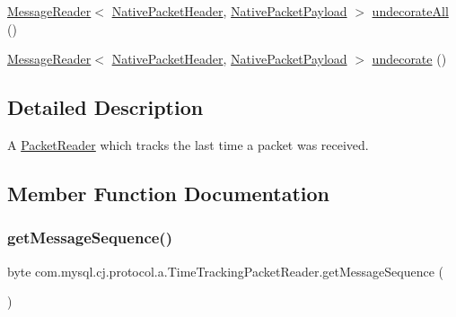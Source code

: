 \begin{DoxyCompactItemize}
\item 
\mbox{\hyperlink{interfacecom_1_1mysql_1_1cj_1_1protocol_1_1_message_reader}{Message\+Reader}}$<$ \mbox{\hyperlink{classcom_1_1mysql_1_1cj_1_1protocol_1_1a_1_1_native_packet_header}{Native\+Packet\+Header}}, \mbox{\hyperlink{classcom_1_1mysql_1_1cj_1_1protocol_1_1a_1_1_native_packet_payload}{Native\+Packet\+Payload}} $>$ \mbox{\hyperlink{classcom_1_1mysql_1_1cj_1_1protocol_1_1a_1_1_time_tracking_packet_reader_ab320fc6184aad94ebdba7260b574421f}{undecorate\+All}} ()
\item 
\mbox{\hyperlink{interfacecom_1_1mysql_1_1cj_1_1protocol_1_1_message_reader}{Message\+Reader}}$<$ \mbox{\hyperlink{classcom_1_1mysql_1_1cj_1_1protocol_1_1a_1_1_native_packet_header}{Native\+Packet\+Header}}, \mbox{\hyperlink{classcom_1_1mysql_1_1cj_1_1protocol_1_1a_1_1_native_packet_payload}{Native\+Packet\+Payload}} $>$ \mbox{\hyperlink{classcom_1_1mysql_1_1cj_1_1protocol_1_1a_1_1_time_tracking_packet_reader_aebbbca667b7f55074795c128c2aff259}{undecorate}} ()
\end{DoxyCompactItemize}


\subsection{Detailed Description}
A \mbox{\hyperlink{}{Packet\+Reader}} which tracks the last time a packet was received. 

\subsection{Member Function Documentation}
\mbox{\label{classcom_1_1mysql_1_1cj_1_1protocol_1_1a_1_1_time_tracking_packet_reader_a436548845d1e371699d0cad877dc717b}} 
\subsubsection{\texorpdfstring{get\+Message\+Sequence()}{getMessageSequence()}}
{\footnotesize\ttfamily byte com.\+mysql.\+cj.\+protocol.\+a.\+Time\+Tracking\+Packet\+Reader.\+get\+Message\+Sequence (\begin{DoxyParamCaption}{ }\end{DoxyParamCaption})}

